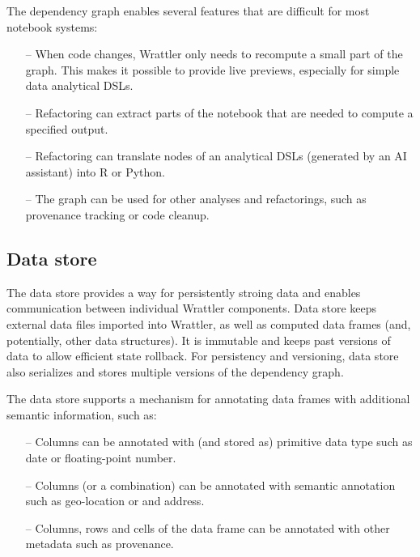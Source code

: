 \documentclass[sigplan,preprint,10pt]{acmart}\settopmatter{printfolios=true,printccs=false,printacmref=false}
\theoremstyle{plain}
\theoremstyle{definition}
\begin{document}
The dependency graph enables several features that are difficult for most notebook systems:
%
\begin{itemize}
\item[--] When code changes, Wrattler only needs to recompute a small part of the graph.
  This makes it possible to provide live previews, especially for simple data analytical DSLs.
\vspace{-0.85em}
\item[--] Refactoring can extract parts of the notebook that
  are needed to compute a specified output.
\vspace{0.25em}
\item[--] Refactoring can translate nodes of an analytical DSLs (generated by an AI assistant) into R or Python.
\vspace{0.25em}
\item[--] The graph can be used for other analyses and refactorings, such as provenance tracking
  or code cleanup.
\end{itemize}

\subsection{Data store}
\label{sec:wrattler-ds}

The data store provides a way for persistently stroing data and enables communication between
individual Wrattler components. Data store keeps external data files imported into Wrattler,
as well as computed data frames (and, potentially, other data structures). It is immutable
and keeps past versions of data to allow efficient state rollback. For persistency and versioning,
data store also serializes and stores multiple versions of the dependency graph.

The data store supports a mechanism for annotating data frames with additional semantic information, such as:
%
\begin{itemize}
\item[--] Columns can be annotated with (and stored as) primitive data type such as date or floating-point number.
\vspace{0.25em}
\item[--] Columns (or a combination) can be annotated with semantic annotation such as geo-location or and address.
\vspace{-0.85em}
\item[--] Columns, rows and cells of the data frame can be annotated with other metadata such as provenance.
\end{itemize}
\end{document}
